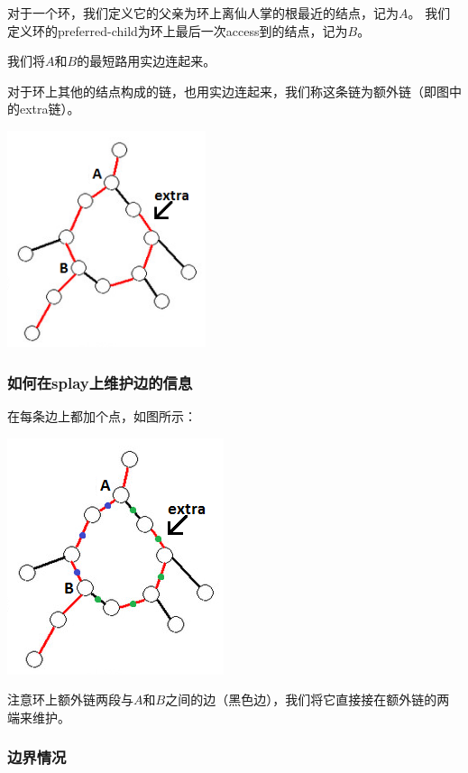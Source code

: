 \documentclass{noithesis}
\begin{document}
\text{}

对于一个环，我们定义它的父亲为环上离仙人掌的根最近的结点，记为$A$。
我们定义环的preferred-child为环上最后一次access到的结点，记为$B$。

我们将$A$和$B$的最短路用实边连起来。

对于环上其他的结点构成的链，也用实边连起来，我们称这条链为$\textbf{额外链}$（即图中的extra链）。

\includegraphics[width=165pt,height=180.125pt]{images/lcc-cycle.png}



\subsubsection{如何在splay上维护边的信息}

在每条边上都加个点，如图所示：

\includegraphics{images/lcc-cycle-1.png}

注意环上额外链两段与$A$和$B$之间的边（黑色边），我们将它直接接在额外链的两端来维护。


\subsubsection{边界情况}
\end{document}
